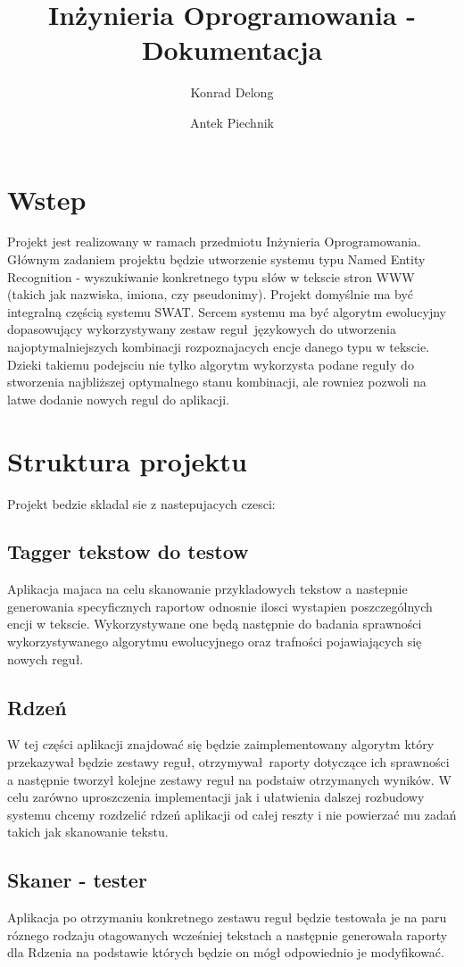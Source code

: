 \documentclass[12pt]{article}
\author{Konrad Delong \and Antek Piechnik}
\title{Inżynieria Oprogramowania - Dokumentacja}
\begin{document}
\maketitle
\tableofcontents
\newpage

\section{Wstep}
Projekt jest realizowany w ramach przedmiotu Inżynieria Oprogramowania. Głównym zadaniem projektu będzie utworzenie systemu typu Named Entity Recognition - wyszukiwanie konkretnego typu słów w tekscie stron WWW (takich jak nazwiska, imiona, czy pseudonimy). Projekt domyślnie ma być integralną częścią systemu SWAT. Sercem systemu ma być algorytm ewolucyjny dopasowujący wykorzystywany zestaw reguł językowych do utworzenia najoptymalniejszych kombinacji rozpoznajacych encje danego typu w tekscie. Dzieki takiemu podejsciu nie tylko algorytm wykorzysta podane reguły do stworzenia najbliższej optymalnego stanu kombinacji, ale rowniez pozwoli na latwe dodanie nowych regul do aplikacji.
\section{Struktura projektu}
Projekt bedzie skladal sie z nastepujacych czesci:
\subsection{Tagger tekstow do testow}
Aplikacja majaca na celu skanowanie przykladowych tekstow a nastepnie generowania specyficznych raportow odnosnie ilosci wystapien poszczególnych encji w tekscie. Wykorzystywane one będą następnie do badania sprawności wykorzystywanego algorytmu ewolucyjnego oraz trafności pojawiających się nowych reguł.
\subsection{Rdzeń}
W tej części aplikacji znajdować się będzie zaimplementowany algorytm który przekazywał będzie zestawy reguł, otrzymywał raporty dotyczące ich sprawności a następnie tworzył kolejne zestawy reguł na podstaiw otrzymanych wyników. W celu zarówno uproszczenia implementacji jak i ułatwienia dalszej rozbudowy systemu chcemy rozdzelić rdzeń aplikacji od całej reszty i nie powierzać mu zadań takich jak skanowanie tekstu.
\subsection{Skaner - tester}
Aplikacja po otrzymaniu konkretnego zestawu reguł będzie testowała je na paru róznego rodzaju otagowanych wcześniej tekstach a następnie generowała raporty dla Rdzenia na podstawie których będzie on mógł odpowiednio je modyfikować.
\end{document}
